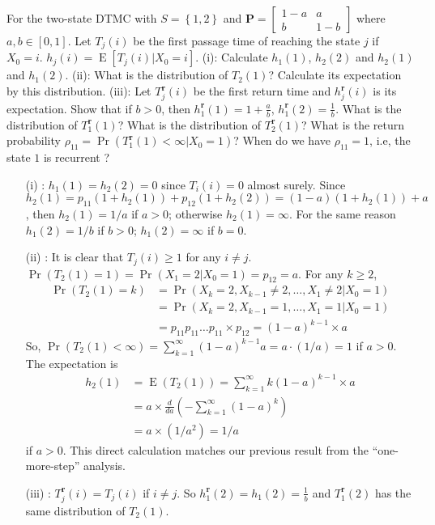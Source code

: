 \documentclass[  11pt]{article}
\newcommand{\p}{ {\Pr}}
\newcommand{\e}{ \operatorname{E}}
\newcommand{\Pm}{{\mathbf{P}}}
\newcommand{\set}[1]{\left\{#1\right\}}
\newcommand{\rt}{{\textbf{r}}}
\begin{document}
\begin{ExerciseList}
\Exercise
For the two-state DTMC with $ {S}=\set{1,2}$ and 
 $\Pm = \begin{bmatrix} 1- a & a \\ b & 1-b \end{bmatrix}$ where 
$a,b\in [0,1]$. 
Let $T_j(i)$ be the first passage time of reaching the state $j$ if $X_0=i$.
$h_j(i)=\e[T_j(i)|X_0=i]$.
(i): 
Calculate $h_1(1)$, $h_2(2)$ %
 and $h_2(1)$ and $h_1(2)$. %
 (ii): What is the distribution of $T_2(1)$? 
 Calculate its expectation by this distribution.
(iii):  Let $T^\rt_j(i)$ be the first return time and $h^\rt_j(i)$ is its expectation.
 Show that if $b>0$, then $h^\rt_1(1)=1+\frac{a}{b}$, $h^\rt_1(2)=\frac{1}{b}$.
 What is the distribution of $T^\rt_1(1)$?
What is the distribution of    $T^\rt_2(1)$?
What is the return probability $\rho_{11}=\p(T^\rt_1(1)<\infty \vert X_0=1)$?
When do we have $\rho_{11}=1$, i.e, the state $1$ is recurrent ?
 \Answer
\par
\begin{enumerate}
\item[(i)]: 
$h_1(1)=h_2(2)=0$ since $T_i(i)=0$ almost surely.
Since $h_2(1)= p_{11}(1+h_2(1)) + p_{12}(1+h_2(2))=(1-a)(1+h_2(1)) + a $,
then $h_2(1)=1/a$ if $a>0$; otherwise $h_2(1)=\infty$.
For the same reason  $h_1(2)=1/b$ if $b>0$;   $h_1(2)=\infty$ if $b=0$. 
\item[(ii)]: It is clear that $T_j(i) \geq 1$ for any $i\neq j$.
$\p(T_2(1)=1)=\p( X_1 =2 \vert X_0=1 )=p_{12}=a$.
For any $k\geq 2$,   
\[
\begin{split}
\p(T_2(1)=k)&=\p( X_{k}=2, X_{k-1} \neq 2, \ldots, X_1\neq 2 \vert X_0=1 )
\\
&=\p( X_{k}=2, X_{k-1} =1, \ldots, X_1=1 \vert X_0=1 )
\\
&=p_{11}p_{11}\ldots p_{11} \times p_{12}=(1-a)^{k-1}\times a
\end{split}
\]
So,
$\p(T_2(1)<\infty)=  \sum _{k=1}^\infty  (1-a)^{k-1} a =a  \cdot (1/a)=1 $ if $a>0$.
The expectation is 
\[\begin{split} h_2(1)&=\e(T_2(1)) = \sum _{k=1}^\infty  k(1-a)^{k-1} \times a  \\
&= a \times \frac{d}{da}(-\sum _{k=1}^\infty  (1-a)^{k})\\
&=a \times ( 1/a^2)=1/a
\end{split} \]
if $a>0$. This direct calculation matches our previous result
from the ``one-more-step'' analysis.

\item[(iii)]:  
$T^\rt_j(i)=T_j(i)$ if $i\neq j$.
So $h^\rt_1(2)=h_1(2)=\frac{1}{b}$
and $T^\rt_1(2)$ has the same distribution of $T_2(1)$.


\end{enumerate}
\end{ExerciseList}
\end{document}
